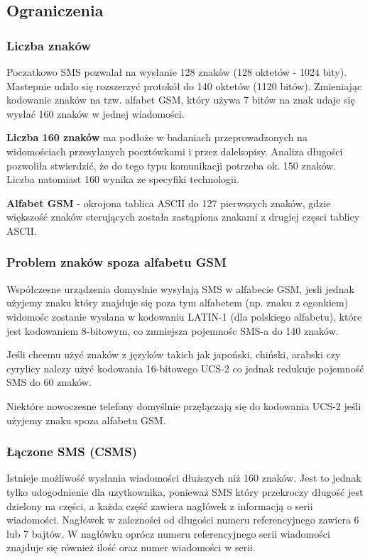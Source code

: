 \documentclass[xcolor=table]{beamer}
\begin{document}
\subsection{Ograniczenia}
\begin{frame}[allowframebreaks]
  \frametitle{Liczba znaków}

  Poczatkowo SMS pozwalał na wysłanie 128 znaków (128 oktetów - 1024 bity).
  Mastepnie udało się rozszerzyć protokół do 140 oktetów (1120 bitów).
  Zmieniając kodowanie znaków na tzw. alfabet GSM, który używa 7 bitów na znak
  udaje się wysłać 160 znaków w jednej wiadomości.

  \textbf{Liczba 160 znaków} ma podłoże w badaniach przeprowadzonych na
  widomościach przesyłanych pocztówkami i przez dalekopisy. Analiza długości
  pozwoliła stwierdzić, że do tego typu komunikacji potrzeba ok. 150 znaków.
  Liczba natomiast 160 wynika ze specyfiki technologii.

  \framebreak

  \textbf{Alfabet GSM} - okrojona tablica ASCII do 127 pierwszych znaków, gdzie
  większość znaków sterujących została zastąpiona znakami z drugiej częsci
  tablicy ASCII.

\end{frame}
\begin{frame}
  \frametitle{Problem znaków spoza alfabetu GSM}

  Współczesne urządzenia domyslnie wysyłają SMS w alfabecie GSM, jesli jednak
  użyjemy znaku który znajduje się poza tym alfabetem (np. znaku z ogonkiem)
  widomośc zostanie wyslana w kodowaniu LATIN-1 (dla polskiego alfabetu), które
  jest kodowaniem 8-bitowym, co zmniejsza pojemnośc SMS-a do 140 znaków.

  Jeśli chcemu użyć znaków z języków takich jak japoński, chiński, arabski czy
  cyrylicy nalezy użyć kodowania 16-bitowego UCS-2 co jednak redukuje pojemność
  SMS do 60 znaków.

  Niektóre nowoczesne telefony domyślnie przęłączają się do kodowania UCS-2
  jeśli użyjemy znaku spoza alfabetu GSM.
\end{frame}

\begin{frame}
  \frametitle{Łączone SMS (CSMS)}

  Istnieje możliwość wysłania wiadomości dłuższych niż 160 znaków. Jest to
  jednak tylko udogodnienie dla uzytkownika, ponieważ SMS który przekroczy
  długość jest dzielony na części, a każda część zawiera nagłówek z informacją
  o serii wiadomości. Nagłówek w zalezności od długości numeru referencyjnego
  zawiera 6 lub 7 bajtów. W nagłówku oprócz numeru referencyjnego serii
  wiadomości znajduje się również ilość oraz numer wiadomości w serii.

\end{frame}
\end{document}
